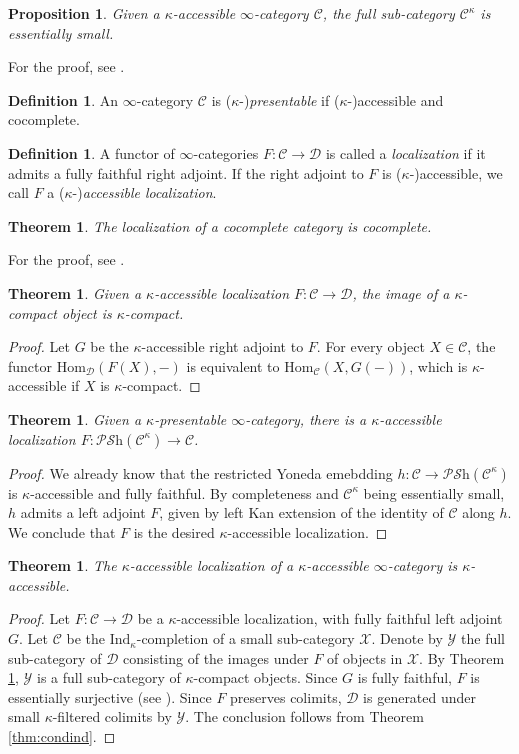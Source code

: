 \documentclass[a4paper]{book}
\newcommand{\lC}{\mathcal{C}}
\newcommand{\lD}{\mathcal{D}}
\newcommand{\lP}{\mathcal{P}}
\newcommand{\lS}{\mathcal{S}}
\newcommand{\lX}{\mathcal{X}}
\newcommand{\lY}{\mathcal{Y}}
\newcommand{\Psh}{\lP\Shv} %
\newcommand{\Shv}{\lS\mathrm{h}} %
\renewcommand{\hom}{\mathrm{Hom}} %
\newcommand{\Ind}{\mathrm{Ind}} %
\newtheorem{theorem}[equation]{Theorem}
\newtheorem{proposition}[equation]{Proposition}
\theoremstyle{definition}
\newtheorem{definition}[equation]{Definition}
\theoremstyle{remark}
\numberwithin{equation}{section}
\begin{document}
\begin{proposition}
	Given a $\kappa$-accessible $\infty$-category $\lC$, the full sub-category $\lC^\kappa$ is essentially small. 
\end{proposition}
For the proof, see \cite[Tag 06K7]{kerodon2026}.
\begin{definition}
	An $\infty$-category $\lC$ is ($\kappa$-)\emph{presentable} if ($\kappa$-)accessible and cocomplete. 
\end{definition}
\begin{definition}
	A functor of $\infty$-categories $F:\lC\to\lD$ is called a \emph{localization} if it admits a fully faithful right adjoint. If the right adjoint to $F$ is ($\kappa$-)accessible, we call $F$ a ($\kappa$-)\emph{accessible localization}.
\end{definition}
\begin{theorem}\label{thm:loccomplete}
	The localization of a cocomplete category is cocomplete. 
\end{theorem}
For the proof, see \cite[Tag 04JW]{kerodon2026}.
\begin{theorem}\label{lem:imofcompact}
	Given a $\kappa$-accessible localization $F:\lC\to\lD$, the image of a $\kappa$-compact object is $\kappa$-compact. 
\end{theorem}
\begin{proof}
	Let $G$ be the $\kappa$-accessible right adjoint to $F$. For every object $X\in\lC$, the functor $\hom_\lD(F(X),-)$ is equivalent to $\hom_\lC(X,G(-))$, which is $\kappa$-accessible if $X$ is $\kappa$-compact. 
\end{proof}
\begin{theorem}
	Given a $\kappa$-presentable $\infty$-category, there is a $\kappa$-accessible localization $F:\Psh(\lC^\kappa)\to\lC$. 
\end{theorem}
\begin{proof}
	We already know that the restricted Yoneda emebdding $h:\lC\to\Psh(\lC^\kappa)$ is $\kappa$-accessible and fully faithful. By completeness and $\lC^\kappa$ being essentially small, $h$ admits a left adjoint $F$, given by left Kan extension of the identity of $\lC$ along $h$. We conclude that $F$ is the desired $\kappa$-accessible localization. 
\end{proof}
\begin{theorem}\label{lem:indcompletion}
	The $\kappa$-accessible localization of a $\kappa$-accessible $\infty$-category is $\kappa$-accessible.  
\end{theorem}
\begin{proof}
	Let $F:\lC\to\lD$ be a $\kappa$-accessible localization, with fully faithful left adjoint $G$. Let $\lC$ be the $\Ind_\kappa$-completion of a small sub-category $\lX$. Denote by $\lY$ the full sub-category of $\lD$ consisting of the images under $F$ of objects in $\lX$. By Theorem \ref{lem:imofcompact}, $\lY$ is a full sub-category of $\kappa$-compact objects. Since $G$ is fully faithful, $F$ is essentially surjective (see \cite[Tag 02FF]{kerodon2026}). Since $F$ preserves colimits, $\lD$ is generated under small $\kappa$-filtered colimits by $\lY$. The conclusion follows from Theorem \ref{thm:condind}.
\end{proof}
\end{document}
